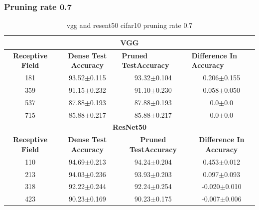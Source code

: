 \subsubsection*{Pruning rate 0.7}
\begin{table}[]
\begin{tabular}{@{}cccc@{}}
\toprule
\multicolumn{4}{c}{\textbf{VGG}}                                                                                                                                  \\ \midrule
\textbf{Receptive Field} & \textbf{Dense Test Accuracy} & \multicolumn{1}{l}{\textbf{Pruned  TestAccuracy}} & \multicolumn{1}{l}{\textbf{Difference In Accuracy}} \\ \midrule
181                      & 93.52$\pm$0.115              & 93.32$\pm$0.104                                   & 0.206$\pm$0.155                                     \\
359                      & 91.15$\pm$0.232              & 91.10$\pm$0.230                                   & 0.058$\pm$0.050                                     \\
537                      & 87.88$\pm$0.193              & 87.88$\pm$0.193                                   & 0.0$\pm$0.0                                         \\
715                      & 85.88$\pm$0.217              & 85.88$\pm$0.217                                   & 0.0$\pm$0.0                                         \\ \midrule
\multicolumn{4}{c}{\textbf{ResNet50}}                                                                                                                             \\ \midrule
\textbf{Receptive Field} & \textbf{Dense Test Accuracy} & \textbf{Pruned  TestAccuracy}                     & \textbf{Difference In Accuracy}                     \\
110                      & 94.69$\pm$0.213              & 94.24$\pm$0.204                                   & 0.453$\pm$0.012                                     \\
213                      & 94.03$\pm$0.236              & 93.93$\pm$0.203                                   & 0.097$\pm$0.093                                     \\
318                      & 92.22$\pm$0.244              & 92.24$\pm$0.254                                   & -0.020$\pm$0.010                                    \\
423                      & 90.23$\pm$0.169              & 90.23$\pm$0.175                                   & -0.007$\pm$0.006                                    \\ \bottomrule
\end{tabular}
\caption{vgg and resent50 cifar10 pruning rate 0.7}
\label{tab:cifar10 pruning rate07}
\end{table}
